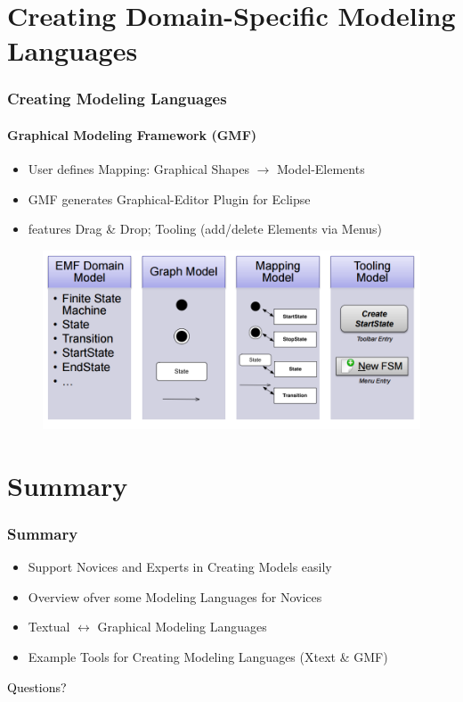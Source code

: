 \documentclass[11 pt,t]{beamer}
\begin{document}
\section{Creating Domain-Specific Modeling Languages}
\begin{frame}
\vspace{.5cm}
  \frametitle{Creating Modeling Languages}
  \framesubtitle{Graphical Modeling Framework (GMF)}
  \begin{itemize}
    \item User defines Mapping: Graphical Shapes $\rightarrow$ Model-Elements
    \item GMF generates Graphical-Editor Plugin for Eclipse 
    \item features Drag \& Drop; Tooling (add/delete Elements via Menus)
  \end{itemize}
  \begin{figure}[htbp]
      \centering
      \includegraphics[width=\textwidth]{../images/TableGMFSteps.PNG}
      \label{mapmodel}
    \end{figure}
\end{frame}

\section{Summary}
\begin{frame}
  \vspace{2cm}
  \frametitle{Summary}
  \begin{itemize}
    \item Support Novices and Experts in Creating Models easily 
    \item Overview ofver some Modeling Languages for Novices
    \item Textual $\leftrightarrow$ Graphical Modeling Languages
    \item Example Tools for Creating Modeling Languages (Xtext \& GMF)
  \end{itemize}
\end{frame}

\appendix
\begin{frame}
\vspace{4cm}
\centering \Large \textcolor{black}{Questions?}

\end{frame}
\end{document}
